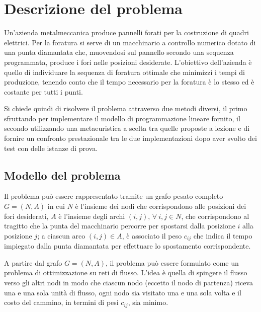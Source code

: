 \section{Descrizione del problema}
Un'azienda metalmeccanica produce pannelli forati per la costruzione di quadri elettrici.
Per la foratura si serve di un macchinario a controllo numerico dotato di una punta diamantata che, muovendosi sul pannello secondo una sequenza programmata, produce i fori nelle posizioni desiderate.
L'obiettivo dell'azienda è quello di individuare la sequenza di foratura ottimale che minimizzi i tempi di produzione, tenendo conto che il tempo necessario per la foratura è lo stesso ed è costante per tutti i punti.

Si chiede quindi di risolvere il problema attraverso due metodi diversi, il primo sfruttando  per implementare il modello di programmazione lineare fornito, il secondo utilizzando una metaeuristica a scelta tra quelle proposte a lezione e di fornire un confronto prestazionale tra le due implementazioni dopo aver svolto dei test con delle istanze di prova.

\subsection{Modello del problema}
Il problema può essere rappresentato tramite un grafo pesato completo $G = (N, A)$ in cui $N$ è l'insieme dei nodi che corrispondono alle posizioni dei fori desiderati, $A$ è l'insieme degli archi $(i, j)$, $\forall\ i, j \in N$, che corrispondono al tragitto che la punta del macchinario percorre per spostarsi dalla posizione $i$ alla posizione $j$; a ciascun arco $(i, j) \in A$, è associato il peso $c_{ij}$ che indica il tempo impiegato dalla punta diamantata per effettuare lo spostamento corrispondente.

A partire dal grafo $G = (N, A)$, il problema può essere formulato come un problema di ottimizzazione su reti di flusso.
L'idea è quella di spingere il flusso verso gli altri nodi in modo che ciascun nodo (eccetto il nodo di partenza) riceva una e una sola unità di flusso, ogni nodo sia visitato una e una sola volta e il costo del cammino, in termini di pesi $c_{ij}$, sia minimo.

